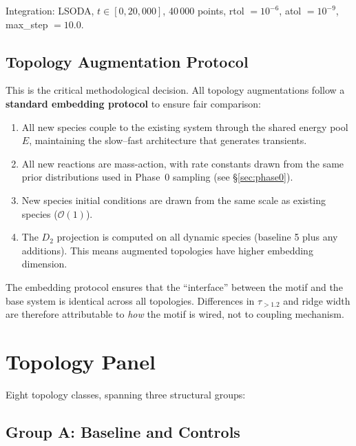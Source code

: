 \documentclass[aps,prl,twocolumn,superscriptaddress,floatfix]{revtex4-2}
\newcommand{\tauexp}{\tau_{>1.2}}
\newcommand{\Dtwo}{D_2}
\begin{document}
Integration: LSODA, $t \in [0, 20{,}000]$, 40\,000 points,
rtol $= 10^{-6}$, atol $= 10^{-9}$, max\_step $= 10.0$.

\subsection{Topology Augmentation Protocol}
\label{sec:embedding}

This is the critical methodological decision.  All topology
augmentations follow a \textbf{standard embedding protocol} to
ensure fair comparison:

\begin{enumerate}
  \item All new species couple to the existing system through the
    shared energy pool $E$, maintaining the slow--fast architecture
    that generates transients.

  \item All new reactions are mass-action, with rate constants
    drawn from the same prior distributions used in Phase~0
    sampling (see \S\ref{sec:phase0}).

  \item New species initial conditions are drawn from the same
    scale as existing species ($\mathcal{O}(1)$).

  \item The $\Dtwo$ projection is computed on all dynamic species
    (baseline 5 plus any additions).  This means augmented
    topologies have higher embedding dimension.
\end{enumerate}

The embedding protocol ensures that the ``interface'' between
the motif and the base system is identical across all topologies.
Differences in $\tauexp$ and ridge width are therefore attributable
to \emph{how} the motif is wired, not to coupling mechanism.

\section{Topology Panel}
\label{sec:panel}

Eight topology classes, spanning three structural groups:

\subsection{Group A: Baseline and Controls}
\end{document}
